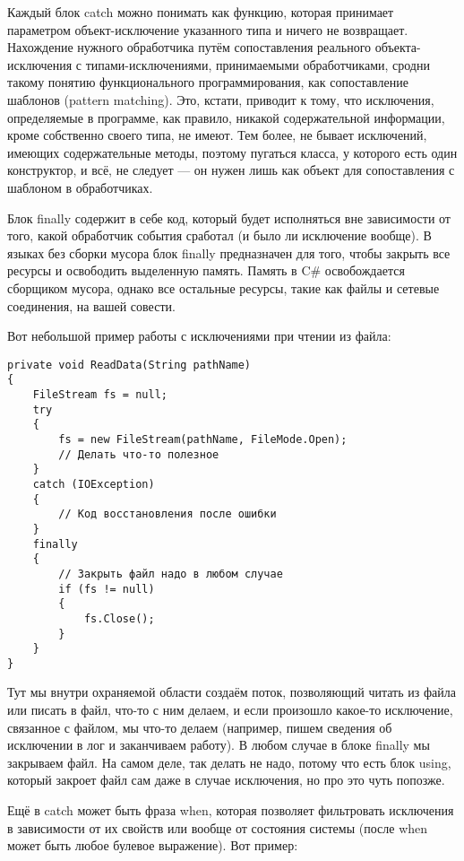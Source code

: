 \documentclass[a5paper]{article}
\begin{document}
Каждый блок catch можно понимать как функцию, которая принимает параметром объект-исключение указанного типа и ничего не возвращает. Нахождение нужного обработчика путём сопоставления реального объекта-исключения с типами-исключениями, принимаемыми обработчиками, сродни такому понятию функционального программирования, как сопоставление шаблонов (pattern matching). Это, кстати, приводит к тому, что исключения, определяемые в программе, как правило, никакой содержательной информации, кроме собственно своего типа, не имеют. Тем более, не бывает исключений, имеющих содержательные методы, поэтому пугаться класса, у которого есть один конструктор, и всё, не следует --- он нужен лишь как объект для сопоставления с шаблоном в обработчиках.

Блок finally содержит в себе код, который будет исполняться вне зависимости от того, какой обработчик события сработал (и было ли исключение вообще). В языках без сборки мусора блок finally предназначен для того, чтобы закрыть все ресурсы и освободить выделенную память. Память в C\# освобождается сборщиком мусора, однако все остальные ресурсы, такие как файлы и сетевые соединения, на вашей совести. 

Вот небольшой пример работы с исключениями при чтении из файла:

\begin{verbatim}
private void ReadData(String pathName) 
{
    FileStream fs = null;
    try 
    {
        fs = new FileStream(pathName, FileMode.Open);
        // Делать что-то полезное
    }
    catch (IOException) 
    {
        // Код восстановления после ошибки
    }
    finally 
    {
        // Закрыть файл надо в любом случае
        if (fs != null) 
        {
            fs.Close();
        }
    }
}
\end{verbatim}

Тут мы внутри охраняемой области создаём поток, позволяющий читать из файла или писать в файл, что-то с ним делаем, и если произошло какое-то исключение, связанное с файлом, мы что-то делаем (например, пишем сведения об исключении в лог и заканчиваем работу). В любом случае в блоке finally мы закрываем файл. На самом деле, так делать не надо, потому что есть блок using, который закроет файл сам даже в случае исключения, но про это чуть попозже.

Ещё в catch может быть фраза when, которая позволяет фильтровать исключения в зависимости от их свойств или вообще от состояния системы (после when может быть любое булевое выражение). Вот пример:
\end{document}
